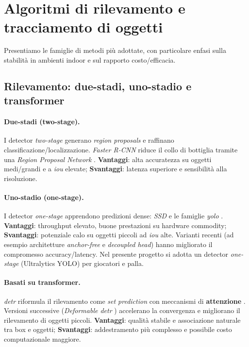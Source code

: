 \documentclass[12pt,a4paper,openright,twoside]{book}
\begin{document}
\section{Algoritmi di rilevamento e tracciamento di oggetti}
\label{sec:algoritmi-rilevamento-tracciamento}
Presentiamo le famiglie di metodi più adottate, con particolare enfasi sulla stabilità in ambienti indoor e sul rapporto costo/efficacia.

\subsection{Rilevamento: due-stadi, uno-stadio e transformer}

\paragraph{Due-stadi (two-stage).} I detector \emph{two-stage} generano \emph{region proposals} e raffinano classificazione/localizzazione.
\textit{Faster R-CNN} riduce il collo di bottiglia tramite una \emph{Region Proposal Network} \cite{ren2015faster}. 
\textbf{Vantaggi}: alta accuratezza su oggetti medi/grandi e a \emph{\ac{iou}} elevate; 
\textbf{Svantaggi}: latenza superiore e sensibilità alla risoluzione.

\paragraph{Uno-stadio (one-stage).} I detector \emph{one-stage} apprendono predizioni dense: \textit{SSD} \cite{liu2016ssd} e le famiglie
\textit{\ac{yolo}} \cite{redmon2018yolov3}. \textbf{Vantaggi}: throughput elevato, buone prestazioni su hardware
commodity; \textbf{Svantaggi}: potenziale calo su oggetti piccoli ad \emph{\ac{iou}} alte. Varianti recenti (ad esempio architetture
\emph{anchor-free} e \emph{decoupled head}) hanno migliorato il compromesso accuracy/latency. Nel presente progetto si
adotta un detector \emph{one-stage} (Ultralytics YOLO) per giocatori e palla.

\paragraph{Basati su transformer.} \textit{\ac{detr}} riformula il rilevamento come \emph{set prediction} con meccanismi di 
\textbf{attenzione} \cite{carion2020detr}. Versioni successive (\textit{Deformable \ac{detr}} \cite{zhu2021deformable}) accelerano
la convergenza e migliorano il rilevamento di oggetti piccoli. \textbf{Vantaggi}: qualità stabile e associazione naturale tra box e oggetti; \textbf{Svantaggi}: 
addestramento più complesso e possibile costo computazionale maggiore.
\end{document}
